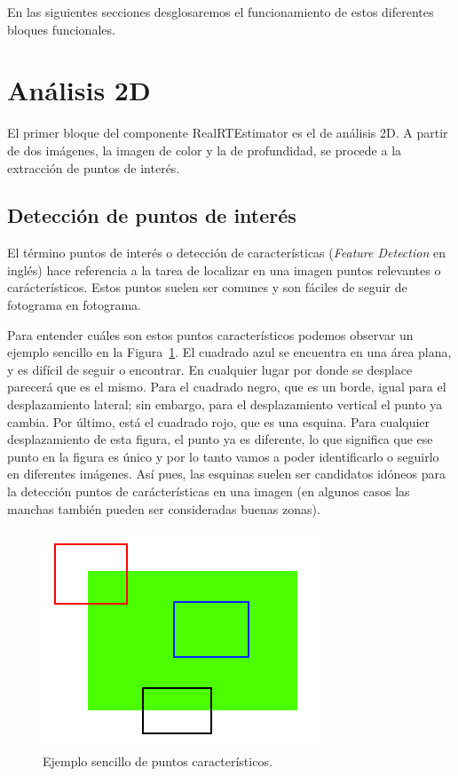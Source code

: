 En las siguientes secciones desglosaremos el funcionamiento de estos diferentes bloques funcionales.

\section{Análisis 2D}

El primer bloque del componente RealRTEstimator es el de análisis 2D. A partir de dos imágenes, la imagen de color y la de profundidad, se procede a la extracción de puntos de interés.

\subsection{Detección de puntos de interés}

El término puntos de interés o detección de características (\textit{Feature Detection} en inglés) hace referencia a la tarea de localizar en una imagen puntos relevantes o carácterísticos. Estos puntos suelen ser comunes y son fáciles de seguir de fotograma en fotograma.

Para entender cuáles son estos puntos característicos podemos observar un ejemplo sencillo en la Figura~\ref{fig:feature_simple}. El cuadrado azul se encuentra en una área plana, y es difícil de seguir o encontrar. En cualquier lugar por donde se desplace parecerá que es el mismo. Para el cuadrado negro, que es un borde, igual para el desplazamiento lateral; sin embargo, para el desplazamiento vertical el punto ya cambia. Por último, está el cuadrado rojo, que es una esquina. Para cualquier desplazamiento de esta figura, el punto ya es diferente, lo que significa que ese punto en la figura es único y por lo tanto vamos a poder identificarlo o seguirlo en diferentes imágenes. Así pues, las esquinas suelen ser candidatos idóneos para la detección puntos de carácterísticas en una imagen (en algunos casos las manchas también pueden ser consideradas buenas zonas).

\begin{figure}[!ht]
\centering
\includegraphics[scale=0.7]{Figures/feature_simple.png}
\decoRule
\caption[Ejemplo de puntos de interés]{Ejemplo sencillo de puntos característicos.}
\label{fig:feature_simple}
\end{figure}

